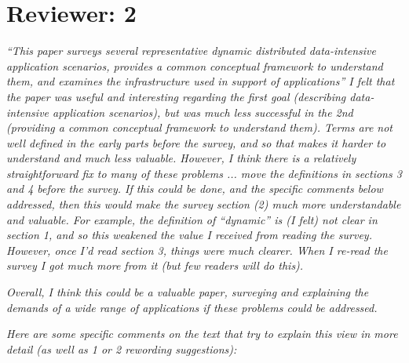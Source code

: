\documentclass{article}
\begin{document}
\section{Reviewer: 2}


\emph{``This paper surveys several representative dynamic distributed data-intensive application scenarios, provides a common conceptual framework to understand them, and examines the infrastructure used in support of applications'' I felt that the paper was useful and interesting regarding the first goal (describing data-intensive application scenarios), but was much less successful in the 2nd (providing a common conceptual framework to understand them). Terms are not well defined in the early parts before the survey, and so that makes it harder to understand and much less valuable. However, I think there is a relatively straightforward fix to many of these problems ... move the definitions in sections 3 and 4 before the survey. If this could be done, and the specific comments below addressed, then this would make the survey section (2) much more understandable and valuable. For example, the definition of ``dynamic'' is (I felt) not clear in section 1, and so this weakened the value I received from reading the survey. However, once I'd read section 3, things were much clearer. When I re-read the survey I got much more from it (but few readers will do this).}

\emph{Overall, I think this could be a valuable paper, surveying and explaining the demands of a wide range of applications if these problems could be addressed.}

\emph{Here are some specific comments on the text that try to explain this view in more detail (as well as 1 or 2 rewording suggestions):}
\end{document}
